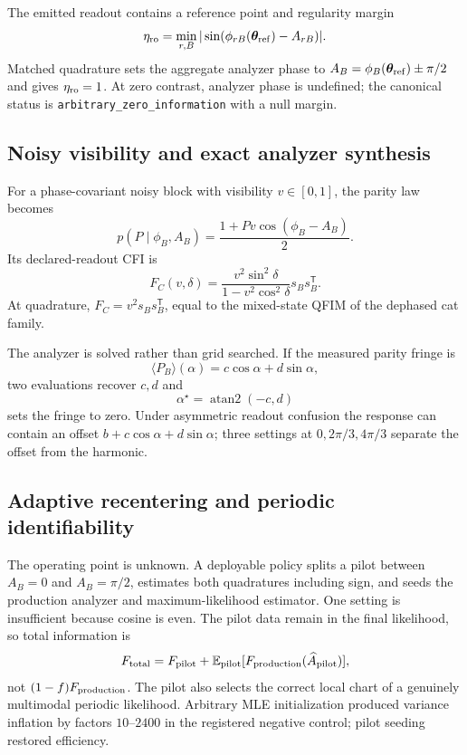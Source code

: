 \documentclass[11pt]{article}
\theoremstyle{definition}
\theoremstyle{remark}
\begin{document}
The emitted readout contains a reference point and regularity margin
\begin{equation}
  \eta_{\rm ro}=
  \min_{r,B}|\sin(\phi_{rB}(\bm\theta_{\rm ref})-A_{rB})|.
  \label{eq:readout-margin}
\end{equation}
Matched quadrature sets the aggregate analyzer phase to $A_B=\phi_B(\bm\theta_{\rm ref})\pm\pi/2$ and gives $\eta_{\rm ro}=1$. At zero contrast, analyzer phase is undefined; the canonical status is \texttt{arbitrary\_zero\_information} with a null margin.

\subsection{Noisy visibility and exact analyzer synthesis}
For a phase-covariant noisy block with visibility $v\in[0,1]$, the parity law becomes
\begin{equation}
  p(P\mid\phi_B,A_B)=\frac{1+Pv\cos(\phi_B-A_B)}{2}.
  \label{eq:noisy-parity-law}
\end{equation}
Its declared-readout CFI is
\begin{equation}
  F_C(v,\delta)=
  \frac{v^2\sin^2\delta}{1-v^2\cos^2\delta}
  s_Bs_B^{\mathsf T}.
  \label{eq:noisy-cfi-closed}
\end{equation}
At quadrature, $F_C=v^2s_Bs_B^{\mathsf T}$, equal to the mixed-state QFIM of the dephased cat family.

The analyzer is solved rather than grid searched. If the measured parity fringe is
\begin{equation}
  \langle P_B\rangle(\alpha)=c\cos\alpha+d\sin\alpha,
\end{equation}
two evaluations recover $c,d$ and
\begin{equation}
  \alpha^\star=\operatorname{atan2}(-c,d)
  \label{eq:analyzer-root}
\end{equation}
sets the fringe to zero. Under asymmetric readout confusion the response can contain an offset $b+c\cos\alpha+d\sin\alpha$; three settings at $0,2\pi/3,4\pi/3$ separate the offset from the harmonic.

\subsection{Adaptive recentering and periodic identifiability}
The operating point is unknown. A deployable policy splits a pilot between $A_B=0$ and $A_B=\pi/2$, estimates both quadratures including sign, and seeds the production analyzer and maximum-likelihood estimator. One setting is insufficient because cosine is even. The pilot data remain in the final likelihood, so total information is
\begin{equation}
  F_{\rm total}=F_{\rm pilot}
  +\mathbb E_{\rm pilot}[F_{\rm production}(\widehat A_{\rm pilot})],
  \label{eq:pilot-information}
\end{equation}
not $(1-f)F_{\rm production}$. The pilot also selects the correct local chart of a genuinely multimodal periodic likelihood. Arbitrary MLE initialization produced variance inflation by factors $10$--$2400$ in the registered negative control; pilot seeding restored efficiency.
\end{document}
